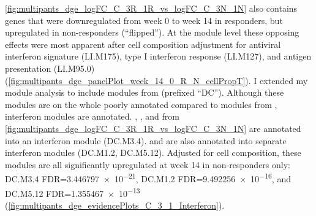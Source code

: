 \autoref{fig:multipants_dge_logFC_C_3R_1R_vs_logFC_C_3N_1N} also contains genes that were downregulated from week 0 to week 14 in responders, but upregulated in non-responders (\enquote{flipped}).
At the module level these opposing effects were most apparent after cell composition adjustment for 
antiviral interferon signature (LI.M175), type I interferon response (LI.M127), and antigen presentation (LI.M95.0) (\autoref{fig:multipants_dge_panelPlot_week_14_0_R_N_cellPropT}).
I extended my module analysis to include modules from \autocite{chaussabel2008ModularAnalysisFramework} (prefixed \enquote{DC}).
Although these modules are on the whole poorly annotated compared to modules from \autocite{li2013MolecularSignaturesAntibody}, interferon modules are annotated.
, , and  from \autoref{fig:multipants_dge_logFC_C_3R_1R_vs_logFC_C_3N_1N} are annotated into an interferon module (DC.M3.4).
 and  are also annotated into separate interferon modules (DC.M1.2, DC.M5.12).
Adjusted for cell composition, these modules are all significantly upregulated at week 14 in non-responders only: 
DC.M3.4
FDR=\num{3.446797e-21},
DC.M1.2
FDR=\num{9.492256e-16},
and DC.M5.12
FDR=\num{1.355467e-13}
(\autoref{fig:multipants_dge_evidencePlots_C_3_1_Interferon}).

